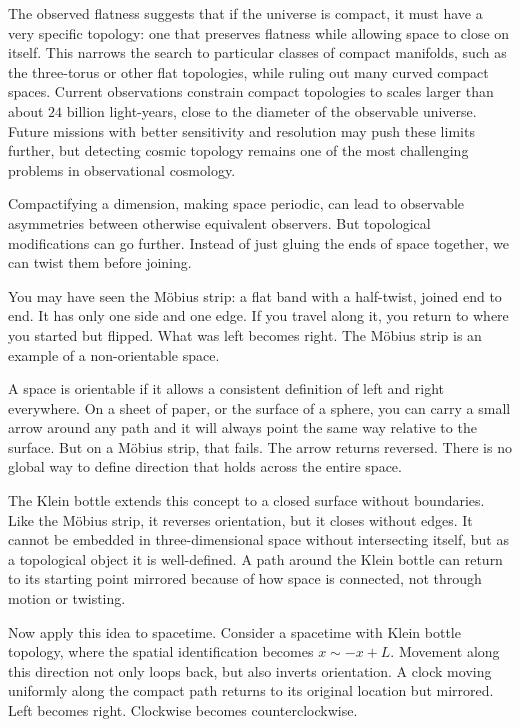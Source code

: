 The observed flatness suggests that if the universe is compact, it must have a very specific topology: one that preserves flatness while allowing space to close on itself. This narrows the search to particular classes of compact manifolds, such as the three-torus or other flat topologies, while ruling out many curved compact spaces. Current observations constrain compact topologies to scales larger than about $24$ billion light-years, close to the diameter of the observable universe. Future missions with better sensitivity and resolution may push these limits further, but detecting cosmic topology remains one of the most challenging problems in observational cosmology.

Compactifying a dimension, making space periodic, can lead to observable asymmetries between otherwise equivalent observers. But topological modifications can go further. Instead of just gluing the ends of space together, we can twist them before joining.

You may have seen the Möbius strip: a flat band with a half-twist, joined end to end. It has only one side and one edge. If you travel along it, you return to where you started but flipped. What was left becomes right. The Möbius strip is an example of a non-orientable space.

A space is orientable if it allows a consistent definition of left and right everywhere. On a sheet of paper, or the surface of a sphere, you can carry a small arrow around any path and it will always point the same way relative to the surface. But on a Möbius strip, that fails. The arrow returns reversed. There is no global way to define direction that holds across the entire space.

The Klein bottle extends this concept to a closed surface without boundaries. Like the Möbius strip, it reverses orientation, but it closes without edges. It cannot be embedded in three-dimensional space without intersecting itself, but as a topological object it is well-defined. A path around the Klein bottle can return to its starting point mirrored because of how space is connected, not through motion or twisting.

Now apply this idea to spacetime. Consider a spacetime with Klein bottle topology, where the spatial identification becomes $x \sim -x + L$. Movement along this direction not only loops back, but also inverts orientation. A clock moving uniformly along the compact path returns to its original location but mirrored. Left becomes right. Clockwise becomes counterclockwise.

